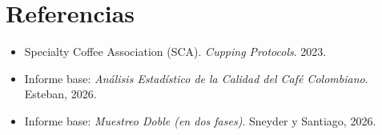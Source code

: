 \documentclass[12pt,a4paper]{article}
\begin{document}
\vfill
\section*{Referencias}

\begin{itemize}
  \item Specialty Coffee Association (SCA). \textit{Cupping Protocols}. 2023.
  \item Informe base: \textit{Análisis Estadístico de la Calidad del Café Colombiano}. Esteban, 2026.
  \item Informe base: \textit{Muestreo Doble (en dos fases)}. Sneyder y Santiago, 2026.
\end{itemize}
\end{document}
